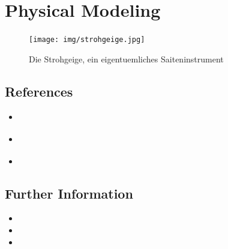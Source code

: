 \chapter{Physical Modeling}
\label{Karplus}

\begin{figure}[h]
  \begin{center}
    \texttt{[image: img/strohgeige.jpg]}
    \caption{Die Strohgeige, ein eigentuemliches Saiteninstrument}
    \label{fig:metering}
  \end{center}
\end{figure}


\section{References}

\begin{itemize}
  \item \cite{bilbao_numerical_2009}
  \item \cite{smith_physical_2010}
  \item \cite{cook_real_2002}
\end{itemize}






\section{Further Information}

\begin{itemize}
  \item {}
  \item {}
  \item {}
\end{itemize}



